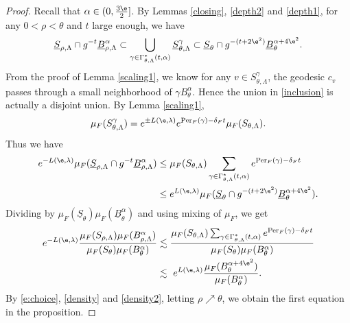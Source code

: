 \documentclass[11pt]{amsart}
\theoremstyle{definition}
\def\lB{{\underline B}}
\def\lS{{\underline S}}
\def\a{\alpha}
\def\c{\gamma}   \def\C{\Gamma}
\def\d{\delta}   %
\def\l{\lambda}   \def\L{\Lambda}
\newcommand{\Per}{\mathrm{Per}}
\begin{document}
\begin{proof}
Recall that $\a\in (0, \frac{3\e}{2}]$. By Lemmas \ref{closing}, \ref{depth2} and \ref{depth1}, for any $0<\rho<\theta$ and $t$ large enough, we have
\begin{equation}\label{inclusion}
\begin{aligned}
\lS_{\rho,\L}\cap g^{-t}\lB_{\rho,\L}^{\a}\subset \bigcup_{\c\in \C^*_{\theta,\L}(t,\a)}\lS_{\theta,\L}^\c \subset \lS_\theta \cap g^{-(t+2\e^2)}\lB_\theta^{\a+4\e^2}.
\end{aligned}
\end{equation}
From the proof of Lemma \ref{scaling1}, we know for any $v\in S_{\theta,\L}^\c$, the geodesic $c_v$ passes through a small neighborhood of $\c B_\theta^\a$. Hence the union in \eqref{inclusion} is actually a disjoint union. By Lemma \ref{scaling1}, 
$$\mu_F(S_{\theta,\L}^\c)=e^{\pm L(\e,\l)}e^{\Per_F(\c)-\d_Ft}\mu_F(S_{\theta,\L}).$$ 
Thus we have
\begin{equation*}
\begin{aligned}
e^{-L(\e,\l)}\mu_F(\lS_{\rho,\L}\cap g^{-t}\lB_{\rho,\L}^{\a})&\le \mu_F(S_{\theta,\L})\sum_{\c\in \C^*_{\theta,\L}(t,\a)}e^{\Per_F(\c)-\d_Ft}\\
&\le e^{L(\e,\l)}\mu_F(\lS_\theta\cap g^{-(t+2\e^2)}\lB_\theta^{\a+4\e^2}).
\end{aligned}
\end{equation*}
Dividing by $\mu_F(\lS_\theta)\mu_F(\lB_\theta^\a)$ and using mixing of $\mu_F$, we get
\begin{equation}\label{e:sim}
\begin{aligned}
e^{-L(\e,\l)}\frac{\mu_F(S_{\rho,\L})\mu_F(B_{\rho,\L}^\a)}{\mu_F(S_\theta)\mu_F(B_\theta^\a)}& \lesssim \frac{\mu_F(S_{\theta,\L})\sum_{\c\in \C^*_{\theta,\L}(t,\a)}e^{\Per_F(\c)-\d_Ft}}{\mu_F(S_\theta)\mu_F(B_\theta^\a)}\\
 & \lesssim \ e^{L(\e,\l)}\frac{\mu_F(B_\theta^{\a+4\e^2})}{\mu_F(B_\theta^\a)}.
\end{aligned}
\end{equation}
By \eqref{e:choice}, \eqref{density} and \eqref{density2}, letting $\rho \nearrow \theta$, we obtain the first equation in the proposition.


\end{proof}
\end{document}
